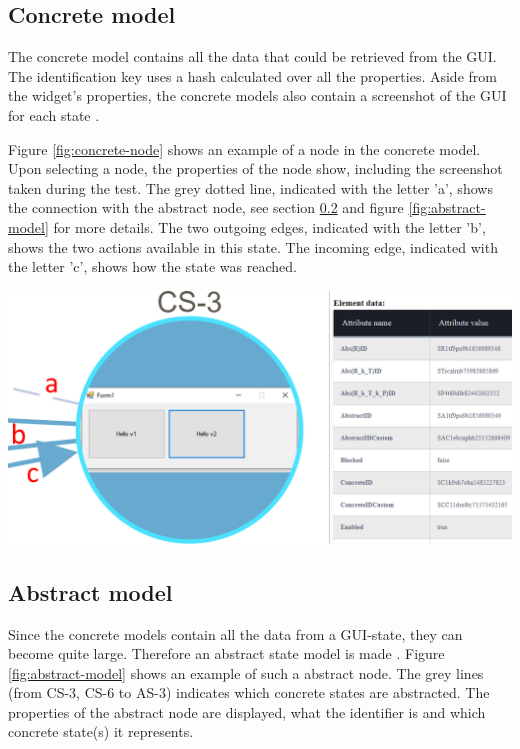 \subsection{Concrete model}
The concrete model contains all the data that could be retrieved from the GUI. The identification key uses a hash calculated over all the properties. Aside from the widget's properties, the concrete models also contain a screenshot of the GUI for each state \cite{thesisMulders}.

Figure \ref{fig:concrete-node} shows an example of a node in the concrete model. Upon selecting a node, the properties of the node show, including the screenshot taken during the test. The grey dotted line, indicated with the letter 'a', shows the connection with the abstract node, see section \ref{abstract-model} and figure \ref{fig:abstract-model} for more details. The two outgoing edges, indicated with the letter 'b', shows the two actions available in this state. The incoming edge, indicated with the letter 'c', shows how the state was reached. 

\bigskip
\begingroup
\captionsetup{type=figure}
\includegraphics[scale=0.5]{images/concrete-model.png}
\label{fig:concrete-node}
\endgroup

\newpage
\subsection{Abstract model} \label{abstract-model}
Since the concrete models contain all the data from a GUI-state, they can become quite large.  Therefore an abstract state model is made \cite{thesisMulders}. Figure \ref{fig:abstract-model} shows an example of such a abstract node. The grey lines (from CS-3, CS-6 to AS-3) indicates which concrete states are abstracted. The properties of the abstract node are displayed, what the identifier is and which concrete state(s) it represents.

